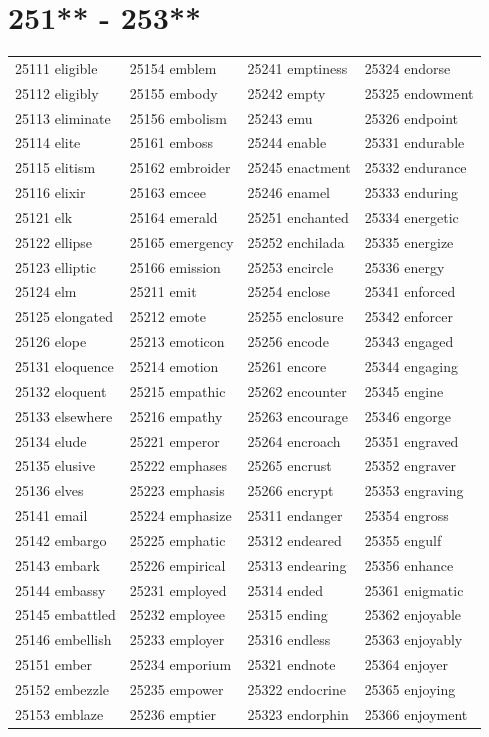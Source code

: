 \documentclass[10pt, oneside]{book}
\begin{document}
\begin{table}
	\centering
	\section*{251** - 253**}
	\begin{tabular}{l l l l}
25111 eligible &25154 emblem &25241 emptiness &25324 endorse\\
25112 eligibly &25155 embody &25242 empty &25325 endowment\\
25113 eliminate &25156 embolism &25243 emu &25326 endpoint\\
25114 elite &25161 emboss &25244 enable &25331 endurable\\
25115 elitism &25162 embroider &25245 enactment &25332 endurance\\
25116 elixir &25163 emcee &25246 enamel &25333 enduring\\
25121 elk &25164 emerald &25251 enchanted &25334 energetic\\
25122 ellipse &25165 emergency &25252 enchilada &25335 energize\\
25123 elliptic &25166 emission &25253 encircle &25336 energy\\
25124 elm &25211 emit &25254 enclose &25341 enforced\\
25125 elongated &25212 emote &25255 enclosure &25342 enforcer\\
25126 elope &25213 emoticon &25256 encode &25343 engaged\\
25131 eloquence &25214 emotion &25261 encore &25344 engaging\\
25132 eloquent &25215 empathic &25262 encounter &25345 engine\\
25133 elsewhere &25216 empathy &25263 encourage &25346 engorge\\
25134 elude &25221 emperor &25264 encroach &25351 engraved\\
25135 elusive &25222 emphases &25265 encrust &25352 engraver\\
25136 elves &25223 emphasis &25266 encrypt &25353 engraving\\
25141 email &25224 emphasize &25311 endanger &25354 engross\\
25142 embargo &25225 emphatic &25312 endeared &25355 engulf\\
25143 embark &25226 empirical &25313 endearing &25356 enhance\\
25144 embassy &25231 employed &25314 ended &25361 enigmatic\\
25145 embattled &25232 employee &25315 ending &25362 enjoyable\\
25146 embellish &25233 employer &25316 endless &25363 enjoyably\\
25151 ember &25234 emporium &25321 endnote &25364 enjoyer\\
25152 embezzle &25235 empower &25322 endocrine &25365 enjoying\\
25153 emblaze &25236 emptier &25323 endorphin &25366 enjoyment\\
	\end{tabular}
 \end{table}
\clearpage
\end{document}
